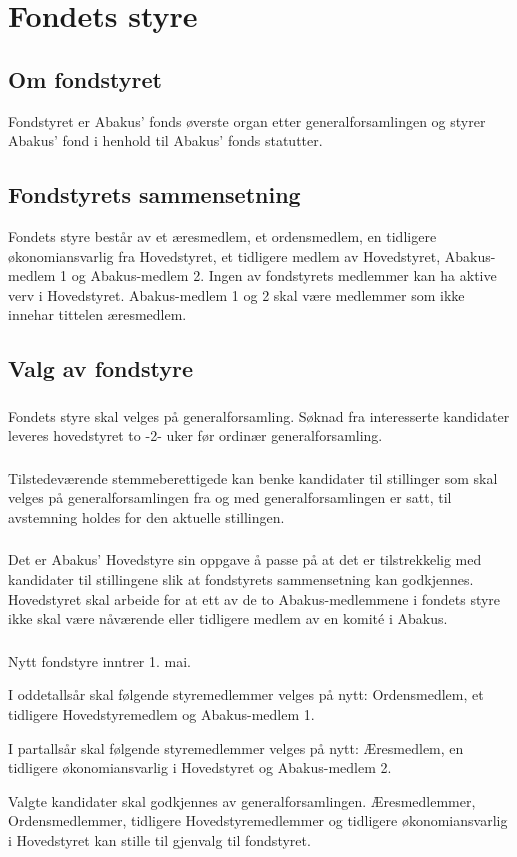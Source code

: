 \section{Fondets styre}
\subsection{Om fondstyret}
Fondstyret er Abakus’ fonds øverste organ etter generalforsamlingen og styrer
Abakus’ fond i henhold til Abakus’ fonds statutter.

\subsection{Fondstyrets sammensetning}
Fondets styre består av et æresmedlem, et ordensmedlem, en tidligere økonomiansvarlig fra
Hovedstyret, et tidligere medlem av Hovedstyret, Abakus-medlem 1 og Abakus-medlem 2.
Ingen av fondstyrets medlemmer kan ha aktive verv i Hovedstyret. Abakus-medlem 1 og 2 skal
være medlemmer som ikke innehar tittelen æresmedlem.

\subsection{Valg av fondstyre}
\subsubsection{}
Fondets styre skal velges på generalforsamling. Søknad fra interesserte kandidater
leveres hovedstyret to -2- uker før ordinær generalforsamling.

\subsubsection{}
Tilstedeværende stemmeberettigede kan benke kandidater til stillinger som skal velges
på generalforsamlingen fra og med generalforsamlingen er satt, til avstemning holdes for
den aktuelle stillingen.

\subsubsection{}
Det er Abakus’ Hovedstyre sin oppgave å passe på at det er tilstrekkelig med kandidater til
stillingene slik at fondstyrets sammensetning kan godkjennes. Hovedstyret skal arbeide for
at ett av de to Abakus-medlemmene i fondets styre ikke skal være nåværende eller tidligere
medlem av en komité i Abakus.

\subsubsection{}
Nytt fondstyre inntrer 1. mai.

I oddetallsår skal følgende styremedlemmer velges på nytt: Ordensmedlem, et tidligere
Hovedstyremedlem og Abakus-medlem 1.

I partallsår skal følgende styremedlemmer velges på nytt: Æresmedlem, en tidligere
økonomiansvarlig i Hovedstyret og Abakus-medlem 2.

Valgte kandidater skal godkjennes av generalforsamlingen. Æresmedlemmer, Ordensmedlemmer,
tidligere Hovedstyremedlemmer og tidligere økonomiansvarlig i Hovedstyret kan
stille til gjenvalg til fondstyret.
